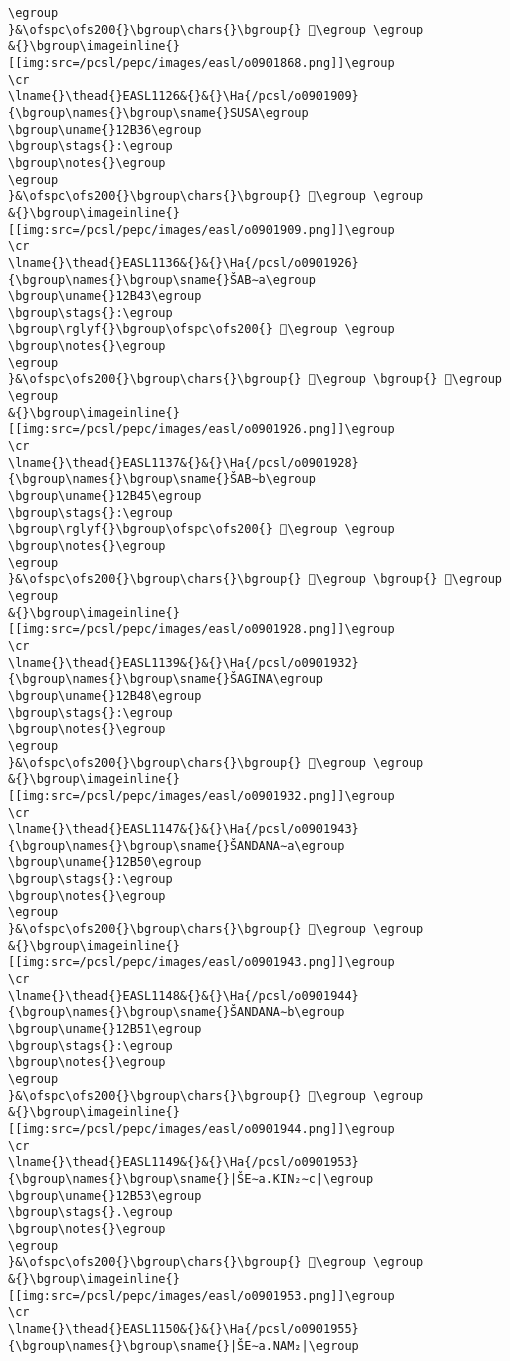 \begin{verbatim}
\egroup
}&\ofspc\ofs200{}\bgroup\chars{}\bgroup{} 𒬚\egroup \egroup
&{}\bgroup\imageinline{}[[img:src=/pcsl/pepc/images/easl/o0901868.png]]\egroup
\cr
\lname{}\thead{}EASL1126&{}&{}\Ha{/pcsl/o0901909}{\bgroup\names{}\bgroup\sname{}SUSA\egroup
\bgroup\uname{}12B36\egroup
\bgroup\stags{}:\egroup
\bgroup\notes{}\egroup
\egroup
}&\ofspc\ofs200{}\bgroup\chars{}\bgroup{} 𒬶\egroup \egroup
&{}\bgroup\imageinline{}[[img:src=/pcsl/pepc/images/easl/o0901909.png]]\egroup
\cr
\lname{}\thead{}EASL1136&{}&{}\Ha{/pcsl/o0901926}{\bgroup\names{}\bgroup\sname{}ŠAB∼a\egroup
\bgroup\uname{}12B43\egroup
\bgroup\stags{}:\egroup
\bgroup\rglyf{}\bgroup\ofspc\ofs200{} 𒭃\egroup \egroup
\bgroup\notes{}\egroup
\egroup
}&\ofspc\ofs200{}\bgroup\chars{}\bgroup{} 𒭂\egroup \bgroup{} 𒭃\egroup \egroup
&{}\bgroup\imageinline{}[[img:src=/pcsl/pepc/images/easl/o0901926.png]]\egroup
\cr
\lname{}\thead{}EASL1137&{}&{}\Ha{/pcsl/o0901928}{\bgroup\names{}\bgroup\sname{}ŠAB∼b\egroup
\bgroup\uname{}12B45\egroup
\bgroup\stags{}:\egroup
\bgroup\rglyf{}\bgroup\ofspc\ofs200{} 𒭅\egroup \egroup
\bgroup\notes{}\egroup
\egroup
}&\ofspc\ofs200{}\bgroup\chars{}\bgroup{} 𒭄\egroup \bgroup{} 𒭅\egroup \egroup
&{}\bgroup\imageinline{}[[img:src=/pcsl/pepc/images/easl/o0901928.png]]\egroup
\cr
\lname{}\thead{}EASL1139&{}&{}\Ha{/pcsl/o0901932}{\bgroup\names{}\bgroup\sname{}ŠAGINA\egroup
\bgroup\uname{}12B48\egroup
\bgroup\stags{}:\egroup
\bgroup\notes{}\egroup
\egroup
}&\ofspc\ofs200{}\bgroup\chars{}\bgroup{} 𒭈\egroup \egroup
&{}\bgroup\imageinline{}[[img:src=/pcsl/pepc/images/easl/o0901932.png]]\egroup
\cr
\lname{}\thead{}EASL1147&{}&{}\Ha{/pcsl/o0901943}{\bgroup\names{}\bgroup\sname{}ŠANDANA∼a\egroup
\bgroup\uname{}12B50\egroup
\bgroup\stags{}:\egroup
\bgroup\notes{}\egroup
\egroup
}&\ofspc\ofs200{}\bgroup\chars{}\bgroup{} 𒭐\egroup \egroup
&{}\bgroup\imageinline{}[[img:src=/pcsl/pepc/images/easl/o0901943.png]]\egroup
\cr
\lname{}\thead{}EASL1148&{}&{}\Ha{/pcsl/o0901944}{\bgroup\names{}\bgroup\sname{}ŠANDANA∼b\egroup
\bgroup\uname{}12B51\egroup
\bgroup\stags{}:\egroup
\bgroup\notes{}\egroup
\egroup
}&\ofspc\ofs200{}\bgroup\chars{}\bgroup{} 𒭑\egroup \egroup
&{}\bgroup\imageinline{}[[img:src=/pcsl/pepc/images/easl/o0901944.png]]\egroup
\cr
\lname{}\thead{}EASL1149&{}&{}\Ha{/pcsl/o0901953}{\bgroup\names{}\bgroup\sname{}|ŠE∼a.KIN₂∼c|\egroup
\bgroup\uname{}12B53\egroup
\bgroup\stags{}.\egroup
\bgroup\notes{}\egroup
\egroup
}&\ofspc\ofs200{}\bgroup\chars{}\bgroup{} 𒭓\egroup \egroup
&{}\bgroup\imageinline{}[[img:src=/pcsl/pepc/images/easl/o0901953.png]]\egroup
\cr
\lname{}\thead{}EASL1150&{}&{}\Ha{/pcsl/o0901955}{\bgroup\names{}\bgroup\sname{}|ŠE∼a.NAM₂|\egroup

\end{verbatim}
